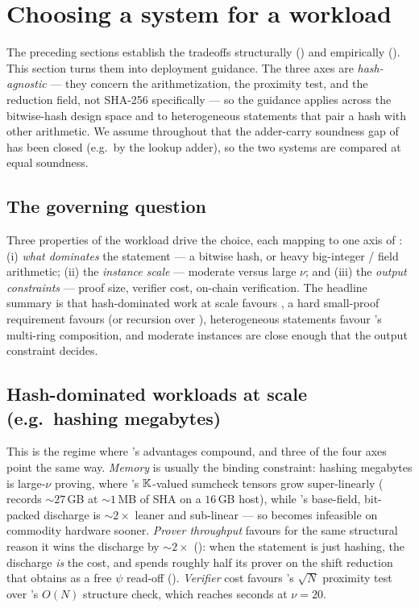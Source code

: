 \section{Choosing a system for a workload}
\label{sec:guidance}

The preceding sections establish the tradeoffs structurally
() and empirically (). This section
turns them into deployment guidance. The three axes are
\emph{hash-agnostic} --- they concern the arithmetization, the proximity
test, and the reduction field, not SHA-256 specifically --- so the
guidance applies across the bitwise-hash design space and to
heterogeneous statements that pair a hash with other arithmetic. We
assume throughout that the adder-carry soundness gap of
 has been closed (e.g.\ by the lookup adder),
so the two systems are compared at equal soundness.

\subsection{The governing question}
\label{sec:guid-question}

Three properties of the workload drive the choice, each mapping to one
axis of : (i) \emph{what dominates} the statement --- a
bitwise hash, or heavy big-integer / field arithmetic; (ii) the
\emph{instance scale} --- moderate versus large $\nu$; and (iii) the
\emph{output constraints} --- proof size, verifier cost, on-chain
verification. The headline summary is that hash-dominated work at scale
favours \zinc{}, a hard small-proof requirement favours \binius{} (or
recursion over \zinc{}), heterogeneous statements favour \zinc{}'s
multi-ring composition, and moderate instances are close enough that the
output constraint decides.

\subsection{Hash-dominated workloads at scale (e.g.\ hashing megabytes)}
\label{sec:guid-hash}

This is the regime where \zinc{}'s advantages compound, and three of the
four axes point the same way. \emph{Memory} is usually the binding
constraint: hashing megabytes is large-$\nu$ proving, where \binius{}'s
$\mathbb{K}$-valued sumcheck tensors grow super-linearly (
records $\sim$$27$\,GB at $\sim$$1$\,MB of SHA on a $16$\,GB host), while
\zinc{}'s base-field, bit-packed discharge is $\sim$$2\times$ leaner and
sub-linear --- so \binius{} becomes infeasible on commodity hardware
sooner. \emph{Prover throughput} favours \zinc{} for the same structural
reason it wins the discharge by $\sim$$2\times$ ():
when the statement is just hashing, the discharge \emph{is} the cost, and
\binius{} spends roughly half its prover on the shift reduction that
\zinc{} obtains as a free $\psi$ read-off (). \emph{Verifier}
cost favours \zinc{}'s $\sqrt N$ proximity test over \binius{}'s $O(N)$
structure check, which reaches seconds at $\nu=20$.

